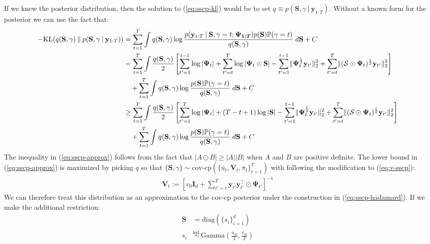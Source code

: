 If we knew the posterior distribution, then the solution to (\ref{eq:sscp-kl}) would be to set $q \equiv p(\mathbf{S}, \gamma\:|\:\mathbf{y}_{1:T})$. Without a known form for the posterior we can use the fact that:
\scriptsize
\begin{align}
    -\text{KL}( q(\mathbf{S}, \gamma) \:\lVert\: p(\mathbf{S}, \gamma\:|\:\mathbf{y}_{1:T})) &= \sum_{t=1}^T\int q(\mathbf{S},\gamma) \log \frac{p(\mathbf{y}_{1:T}\:|\: \mathbf{S},\gamma=t; \boldsymbol{\Psi_{1:T}}) p(\mathbf{S})\Pr(\gamma=t) }{q(\mathbf{S},\gamma) } \;d \mathbf{S} +C \\
    &=  \sum_{t=1}^T\int \frac{q(\mathbf{S},\gamma) }{2}\left[\sum_{t'=1}^{t-1}\log|\boldsymbol{\Psi}_t| + \sum_{t'=t}^T\log|\boldsymbol{\Psi}_t \odot \mathbf{S}| - \sum_{t'=1}^{t-1} \lVert\boldsymbol{\Psi}_t^{\frac{1}{2}}\mathbf{y}_{t'}\rVert_2^2 +\sum_{t'=t}^T \lVert(\mathcal{S}\odot\boldsymbol{\Psi}_t)^{\frac{1}{2}}\mathbf{y}_{t'}\rVert_2^2  \right] \notag \\
    &\quad + \sum_{t=1}^T\int q(\mathbf{S},\gamma) \log \frac{p(\mathbf{S})\Pr(\gamma=t) }{q(\mathbf{S},\gamma) } \;d \mathbf{S} +C \\
    &\geq  \sum_{t=1}^T\int \frac{q(\mathbf{S},\gamma) }{2}\left[\sum_{t'=1}^T\log|\boldsymbol{\Psi}_t| + (T-t+1)\log| \mathbf{S}| - \sum_{t'=1}^{t-1} \lVert\boldsymbol{\Psi}_t^{\frac{1}{2}}\mathbf{y}_{t'}\rVert_2^2 +\sum_{t'=t}^T \lVert(\mathcal{S}\odot\boldsymbol{\Psi}_t)^{\frac{1}{2}}\mathbf{y}_{t'}\rVert_2^2  \right] \notag \\
    &\quad + \sum_{t=1}^T\int q(\mathbf{S},\gamma) \log \frac{p(\mathbf{S})\Pr(\gamma=t) }{q(\mathbf{S},\gamma) } \;d \mathbf{S} +C \label{eq:sscp-approx}
\end{align}
\normalsize
The inequality in (\ref{eq:sscp-approx}) follows from the fact that $|A \odot B| \geq |A| |B|$ when $A$ and $B$ are positive definite. The lower bound in (\ref{eq:sscp-approx}) is maximized by picking $q$ so that $\{\mathbf{S},\gamma\} \sim \text{cov-cp}(\{\overline{u}_t, \overline{\mathbf{V}}_t, \overline{\pi}_t\}_{t=1}^T)$ with following the modification to (\ref{eq:v-sscp}):
\begin{align}
    \overline{\mathbf{V}}_t := \left[v_0\mathbf{I}_d +  \sum_{t'=t}^{T} \mathbf{y}_{t'}\mathbf{y}^\intercal_{t'} \odot \boldsymbol{\Psi}_{t'}\right]^{-1}
\end{align}
We can therefore treat this distribution as an approximation to the cov-cp posterior under the construction in (\ref{eq:sscp-hadamard}). If we make the additional restriction: 
\begin{align}
    \mathbf{S} &= \text{diag}(\{s_i\}_{i=1}^d) \\
    s_i &\overset{\text{ind.}}{\sim} \text{Gamma}\left(\frac{u_{i0}}{2}, \frac{v_{i0}}{2}\right)
\end{align}
